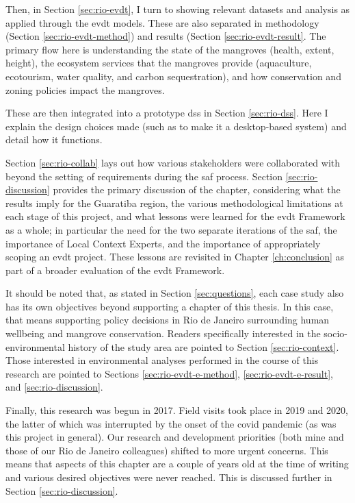 Then, in Section \ref{sec:rio-evdt}, I turn to showing relevant datasets and analysis as applied through the \acf{evdt} models. These are also separated in methodology (Section \ref{sec:rio-evdt-method}) and results (Section \ref{sec:rio-evdt-result}. The primary flow here is understanding the state of the mangroves (health, extent, height), the ecosystem services that the mangroves provide (aquaculture, ecotourism, water quality, and carbon sequestration), and how conservation and zoning policies impact the mangroves. 

These are then integrated into a prototype \ac{dss} in Section \ref{sec:rio-dss}. Here I explain the design choices made (such as to make it a desktop-based system) and detail how it functions. 

Section \ref{sec:rio-collab} lays out how various stakeholders were collaborated with beyond the setting of requirements during the \ac{saf} process. Section \ref{sec:rio-discussion} provides the primary discussion of the chapter, considering what the results imply for the Guaratiba region, the various methodological limitations at each stage of this project, and what lessons were learned for the \ac{evdt} Framework as a whole; in particular the need for the two separate iterations of the \ac{saf}, the importance of Local Context Experts, and the importance of appropriately scoping an \ac{evdt} project. These lessons are revisited in Chapter \ref{ch:conclusion} as part of a broader evaluation of the \ac{evdt} Framework.

It should be noted that, as stated in Section \ref{sec:questions}, each case study also has its own objectives beyond supporting a chapter of this thesis. In this case, that means supporting policy decisions in Rio de Janeiro surrounding human wellbeing and mangrove conservation. Readers specifically interested in the socio-environmental history of the study area are pointed to Section \ref{sec:rio-context}. Those interested in environmental analyses performed in the course of this research are pointed to Sections \ref{sec:rio-evdt-e-method}, \ref{sec:rio-evdt-e-result}, and \ref{sec:rio-discussion}.

Finally, this research was begun in 2017. Field visits took place in 2019 and 2020, the latter of which was interrupted by the onset of the \ac{covid} pandemic (as was this project in general). Our research and development priorities (both mine and those of our Rio de Janeiro colleagues) shifted to more urgent concerns. This means that aspects of this chapter are a couple of years old at the time of writing and various desired objectives were never reached. This is discussed further in Section \ref{sec:rio-discussion}.

